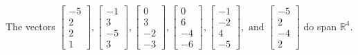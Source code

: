 \begin{exercise}
\begin{exerciseStatement}
  \end{exerciseStatement}
  \begin{exerciseAnswer}
   The vectors \(\left[\begin{array}{r}
-5 \\
2 \\
2 \\
1
\end{array}\right] , \left[\begin{array}{r}
-1 \\
3 \\
-5 \\
3
\end{array}\right] , \left[\begin{array}{r}
0 \\
3 \\
-2 \\
-3
\end{array}\right] , \left[\begin{array}{r}
0 \\
6 \\
-4 \\
-6
\end{array}\right] , \left[\begin{array}{r}
-1 \\
-2 \\
4 \\
-5
\end{array}\right] , \text{ and } \left[\begin{array}{r}
-5 \\
2 \\
-4 \\
2
\end{array}\right]\) 
  	 do  
	span \(\mathbb{R}^4\).
  


  \end{exerciseAnswer}
\end{exercise}